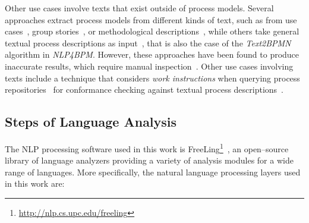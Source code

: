 Other use cases involve texts that exist outside of process models. Several
approaches extract process models from different kinds of text, such as from use
cases~\cite{sinha2010use}, group stories~\cite{gonccalves2009business}, or
methodological descriptions~\cite{epure2015automatic},  while others take
general textual process descriptions as
input~\cite{ghose2007process,friedrich2011process}, that is also the case of the
\emph{Text2BPMN} algorithm in \emph{NLP4BPM}. However,  these approaches
have been found to produce inaccurate results, which require manual
inspection~\cite{selway2015formalising}. Other use cases involving texts include a
technique that considers \textit{work instructions} when querying process
repositories~\cite{leopold2017searching} for conformance checking against
textual process descriptions~\cite{vanderaa2018checking}.

\subsection{Steps of Language Analysis}

The NLP processing software used in this work is
FreeLing\footnote{\url{http://nlp.cs.upc.edu/freeling}}~\cite{PadroS12}, an
open--source library of language analyzers providing a variety of analysis
modules for a wide range of languages. More specifically, the natural language
processing layers used in this work are:
 
